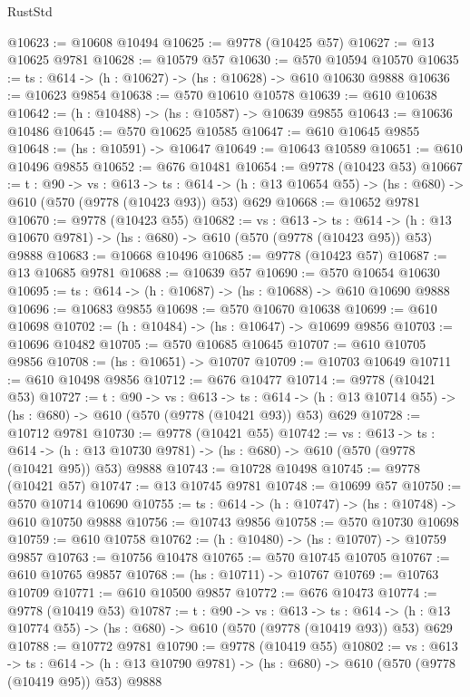 \begin{lexlean}{RustStd}
\begin{coremodule}
@10623 := @10608 @10494
@10625 := @9778 (@10425 @57)
@10627 := @13 @10625 @9781
@10628 := @10579 @57
@10630 := @570 @10594 @10570
@10635 := {ts : @614} -> (h : @10627) -> (hs : @10628) -> @610 @10630 @9888
@10636 := @10623 @9854
@10638 := @570 @10610 @10578
@10639 := @610 @10638
@10642 := (h : @10488) -> (hs : @10587) -> @10639 @9855
@10643 := @10636 @10486
@10645 := @570 @10625 @10585
@10647 := @610 @10645 @9855
@10648 := (hs : @10591) -> @10647
@10649 := @10643 @10589
@10651 := @610 @10496 @9855
@10652 := @676 @10481
@10654 := @9778 (@10423 @53)
@10667 := {t : @90} ->
  {vs : @613} ->
  {ts : @614} -> (h : @13 @10654 @55) -> (hs : @680) -> @610 (@570 (@9778 (@10423 @93)) @53) @629
@10668 := @10652 @9781
@10670 := @9778 (@10423 @55)
@10682 := {vs : @613} ->
  {ts : @614} -> (h : @13 @10670 @9781) -> (hs : @680) -> @610 (@570 (@9778 (@10423 @95)) @53) @9888
@10683 := @10668 @10496
@10685 := @9778 (@10423 @57)
@10687 := @13 @10685 @9781
@10688 := @10639 @57
@10690 := @570 @10654 @10630
@10695 := {ts : @614} -> (h : @10687) -> (hs : @10688) -> @610 @10690 @9888
@10696 := @10683 @9855
@10698 := @570 @10670 @10638
@10699 := @610 @10698
@10702 := (h : @10484) -> (hs : @10647) -> @10699 @9856
@10703 := @10696 @10482
@10705 := @570 @10685 @10645
@10707 := @610 @10705 @9856
@10708 := (hs : @10651) -> @10707
@10709 := @10703 @10649
@10711 := @610 @10498 @9856
@10712 := @676 @10477
@10714 := @9778 (@10421 @53)
@10727 := {t : @90} ->
  {vs : @613} ->
  {ts : @614} -> (h : @13 @10714 @55) -> (hs : @680) -> @610 (@570 (@9778 (@10421 @93)) @53) @629
@10728 := @10712 @9781
@10730 := @9778 (@10421 @55)
@10742 := {vs : @613} ->
  {ts : @614} -> (h : @13 @10730 @9781) -> (hs : @680) -> @610 (@570 (@9778 (@10421 @95)) @53) @9888
@10743 := @10728 @10498
@10745 := @9778 (@10421 @57)
@10747 := @13 @10745 @9781
@10748 := @10699 @57
@10750 := @570 @10714 @10690
@10755 := {ts : @614} -> (h : @10747) -> (hs : @10748) -> @610 @10750 @9888
@10756 := @10743 @9856
@10758 := @570 @10730 @10698
@10759 := @610 @10758
@10762 := (h : @10480) -> (hs : @10707) -> @10759 @9857
@10763 := @10756 @10478
@10765 := @570 @10745 @10705
@10767 := @610 @10765 @9857
@10768 := (hs : @10711) -> @10767
@10769 := @10763 @10709
@10771 := @610 @10500 @9857
@10772 := @676 @10473
@10774 := @9778 (@10419 @53)
@10787 := {t : @90} ->
  {vs : @613} ->
  {ts : @614} -> (h : @13 @10774 @55) -> (hs : @680) -> @610 (@570 (@9778 (@10419 @93)) @53) @629
@10788 := @10772 @9781
@10790 := @9778 (@10419 @55)
@10802 := {vs : @613} ->
  {ts : @614} -> (h : @13 @10790 @9781) -> (hs : @680) -> @610 (@570 (@9778 (@10419 @95)) @53) @9888

\end{coremodule}
\end{lexlean}
